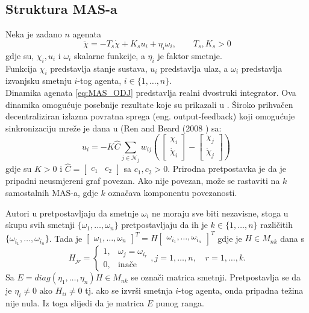 \subsection{Struktura MAS-a}
Neka je zadano $n$ agenata
\begin{equation}
    \ddot{\chi} = -T_s\dot{\chi} + K_s u_i + \eta_i \omega_i, \qquad T_s, K_s >0
    \label{eq:MAS_ODJ}
\end{equation} gdje su, $\chi_i, u_i$ i $\omega_i$ skalarne funkcije, a $\eta_i$ je faktor smetnje.\\
Funkcija $\chi_i$ predstavlja stanje sustava, $u_i$ predstavlja ulaz, a $\omega_i$ predstavlja izvanjsku smetnju $i$-tog agenta, $i \in \{1,\dots, n\}$.\\
Dinamika agenata \eqref{eq:MAS_ODJ} predstavlja realni dvostruki integrator. Ova dinamika omogućuje posebnije rezultate koje su prikazali u \cite{nakic2022short}.
Široko prihvačen decentraliziran izlazna povratna sprega (eng. output-feedback) koji omogućuje sinkronizaciju mreže je dana u (Ren and Beard (2008 \cite{nakic2022short}) sa:
\begin{equation}
    u_i = -K\hat{C}\sum\limits_{j \in \mathcal{N}_j} w_{ij} \left(\:
    \begin{bmatrix}
        \chi_i \\ \dot\chi_i
    \end{bmatrix}- 
    \begin{bmatrix}
        \chi_j \\ \dot\chi_j
    \end{bmatrix}\right)\:
    \label{eq:feedback}
\end{equation}
gdje su $K>0$ i $\hat{C} = \begin{bmatrix}c_1 & c_2\end{bmatrix}$ sa $c_1, c_2>0$.
Prirodna pretpostavka je da je pripadni neusmjereni graf povezan. Ako nije povezan, može se rastaviti na $k$ samostalnih MAS-a, gdje $k$ označava komponentu povezanosti.

Autori u \cite{nakic2022short} pretpostavljaju da smetnje $\omega_i$ ne moraju sve biti nezavisne, stoga u skupu svih smetnji $\{\omega_1, \dots, \omega_n\}$ pretpostavljaju da ih je $ k \in \{1,\dots,n\}$ različitih $\{\omega_{i_1}, \dots, \omega_{i_n}\}$. Tada je $ \begin{bmatrix}\omega_1, \dots, \omega_n\end{bmatrix}^T = H \begin{bmatrix}\omega_{i_1}, \dots, \omega_{i_n}\end{bmatrix}^T$ gdje je $H \in M_{nk}$ dana s 
\begin{equation*}
    H_{jr} = 
    \begin{cases}
        1, & \omega_j = \omega_{i_r} \\
        0, & \text{inače}
    \end{cases}, j=1, \dots ,n, \quad r = 1,\dots, k.
\end{equation*}
Sa $E = diag(\eta_1,\dots , \eta_n)H \in M_{nk}$ se označi matrica smetnji. Pretpostavlja se da je $\eta_i \neq 0 \text{ ako } H_{ii} \neq 0$ tj. ako se izvrši smetnja $i$-tog agenta, onda pripadna težina nije nula. Iz toga slijedi da je matrica $E$ punog ranga.

